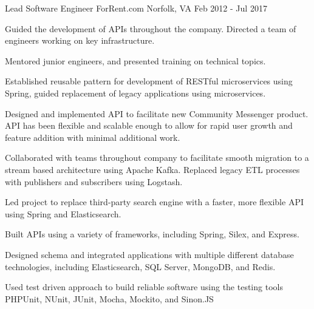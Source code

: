 \begin{cventries}
  \cventry
  {Lead Software Engineer} %
  {ForRent.com} %
  {Norfolk, VA} %
  {Feb 2012 - Jul 2017} %
  {
    \begin{cvitems} %
      \item {Guided the development of APIs throughout the company. Directed a team of engineers
      working on key infrastructure.}
      \item {Mentored junior engineers, and presented training on technical topics.}
      \item {Established reusable pattern for development of RESTful microservices using Spring,
      guided replacement of legacy applications using microservices.}
      \item {Designed and implemented API to facilitate new Community Messenger product. API has
      been flexible and scalable enough to allow for rapid user growth and feature addition with
      minimal additional work.}
      \item {Collaborated with teams throughout company to facilitate smooth migration to a stream
      based architecture using Apache Kafka. Replaced legacy ETL processes with publishers and
      subscribers using Logstash.}
      \item {Led project to replace third-party search engine with a faster, more flexible API using
      Spring and Elasticsearch.}
      \item {Built APIs using a variety of frameworks, including Spring, Silex, and Express.}
      \item {Designed schema and integrated applications with multiple different database
      technologies, including Elasticsearch, SQL Server, MongoDB, and Redis.}
      \item {Used test driven approach to build reliable software using the testing tools PHPUnit,
      NUnit, JUnit, Mocha, Mockito, and Sinon.JS}
    \end{cvitems}
  }


\end{cventries}
